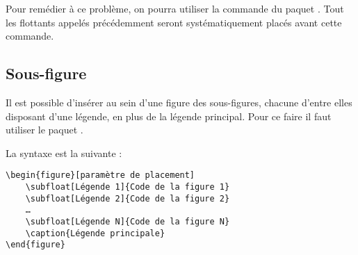 Pour remédier à ce problème, on pourra utiliser la commande  du paquet . 
Tout les flottants appelés précédemment seront systématiquement placés avant cette commande.

\subsection{Sous-figure}

Il est possible d'insérer au sein d'une figure des sous-figures, chacune d'entre elles disposant d'une légende, en plus de la légende principal.
Pour ce faire il faut utiliser le paquet .

La syntaxe est la suivante :  
\begin{verbatim}
\begin{figure}[paramètre de placement]
	\subfloat[Légende 1]{Code de la figure 1}
	\subfloat[Légende 2]{Code de la figure 2}
	…
	\subfloat[Légende N]{Code de la figure N}
	\caption{Légende principale}
\end{figure} 
\end{verbatim}


	